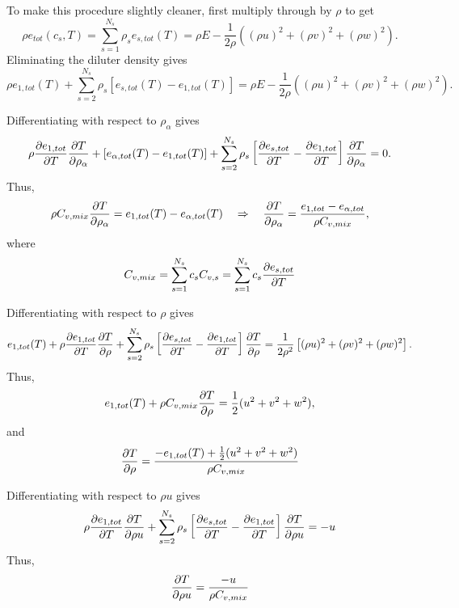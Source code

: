 To make this procedure slightly cleaner, first multiply through by
$\rho$ to get
%
\begin{equation*}
\rho e_{tot}(c_s, T) = \sum_{s=1}^{N_s} \rho_s e_{s,tot}(T) = \rho E - \frac{1}{2 \rho } \left( (\rho u)^2 + (\rho v)^2 + (\rho w)^2 \right).
\end{equation*}
%
Eliminating the diluter density gives
%
\begin{equation*}
\rho e_{1,tot}(T) + \sum_{s=2}^{N_s} \rho_s \left[ e_{s,tot}(T) - e_{1,tot}(T) \right] = \rho E - \frac{1}{2 \rho } \left( (\rho u)^2 + (\rho v)^2 + (\rho w)^2 \right).
\end{equation*}
%

Differentiating with respect to $\rho_{\alpha}$ gives
%
\begin{equation*}
\rho \frac{\partial e_{1,tot}}{\partial T} \frac{\partial T}{\partial \rho_{\alpha}} + \left[ e_{\alpha, tot}(T) - e_{1,tot}(T) \right] + \sum_{s=2}^{N_s} \rho_s \left[ \frac{\partial e_{s,tot}}{\partial T} - \frac{\partial e_{1,tot}}{\partial T} \right] \frac{\partial T}{\partial \rho_{\alpha}} = 0.
\end{equation*}
%
Thus,
%
\begin{equation*}
\rho C_{v,mix} \frac{\partial T}{\partial \rho_{\alpha}} = e_{1,tot}(T) - e_{\alpha,tot}(T) \quad \Rightarrow \quad \frac{\partial T}{\partial \rho_{\alpha}} = \frac{e_{1,tot} - e_{\alpha,tot}}{ \rho C_{v,mix}},
\end{equation*}
%
where
%
\begin{equation*}
C_{v,mix} = \sum_{s=1}^{N_s} c_s C_{v,s} = \sum_{s=1}^{N_s} c_s \frac{\partial e_{s,tot}}{\partial T}
\end{equation*}
%

Differentiating with respect to $\rho$ gives
%
\begin{equation*}
e_{1,tot}(T) + \rho \frac{\partial e_{1,tot}}{\partial T} \frac{\partial T}{\partial \rho} + \sum_{s=2}^{N_s} \rho_s \left[ \frac{\partial e_{s,tot}}{\partial T} - \frac{\partial e_{1,tot}}{\partial T} \right] \frac{\partial T}{\partial \rho} = \frac{1}{2 \rho^2} \left[ (\rho u)^2 + (\rho v)^2 + (\rho w)^2 \right].
\end{equation*}
%
Thus,
%
\begin{equation*}
e_{1,tot}(T) + \rho C_{v,mix} \frac{\partial T}{\partial \rho} = \frac{1}{2} (u^2 + v^2 + w^2),
\end{equation*}
%
and
%
\begin{equation*}
\frac{\partial T}{\partial \rho} = \frac{ -e_{1,tot}(T) + \frac{1}{2} (u^2 + v^2 + w^2) }{\rho C_{v,mix} }
\end{equation*}
%

Differentiating with respect to $\rho u$ gives
%
\begin{equation*}
\rho \frac{\partial e_{1,tot}}{\partial T} \frac{\partial T}{\partial \rho u} + \sum_{s=2}^{N_s} \rho_s \left[ \frac{\partial e_{s,tot}}{\partial T} - \frac{\partial e_{1,tot}}{\partial T} \right] \frac{\partial T}{\partial \rho u} = -u
\end{equation*}
%
Thus,
%
\begin{equation*}
\frac{\partial T}{\partial \rho u} = \frac{-u}{\rho C_{v,mix}}
\end{equation*}
%


